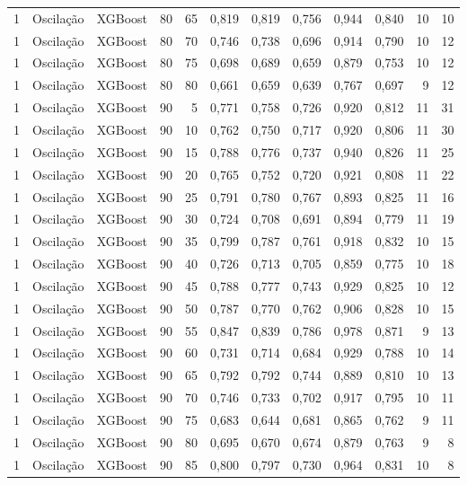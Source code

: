 \begin{longtable}{@{}rllrrrrrrrrr@{}}
1 & Oscilação & XGBoost & 80 & 65 & 0,819 & 0,819 & 0,756 & 0,944 & 0,840 & 10 & 10 \\
1 & Oscilação & XGBoost & 80 & 70 & 0,746 & 0,738 & 0,696 & 0,914 & 0,790 & 10 & 12 \\
1 & Oscilação & XGBoost & 80 & 75 & 0,698 & 0,689 & 0,659 & 0,879 & 0,753 & 10 & 12 \\
1 & Oscilação & XGBoost & 80 & 80 & 0,661 & 0,659 & 0,639 & 0,767 & 0,697 & 9 & 12 \\
1 & Oscilação & XGBoost & 90 & 5 & 0,771 & 0,758 & 0,726 & 0,920 & 0,812 & 11 & 31 \\
1 & Oscilação & XGBoost & 90 & 10 & 0,762 & 0,750 & 0,717 & 0,920 & 0,806 & 11 & 30 \\
1 & Oscilação & XGBoost & 90 & 15 & 0,788 & 0,776 & 0,737 & 0,940 & 0,826 & 11 & 25 \\
1 & Oscilação & XGBoost & 90 & 20 & 0,765 & 0,752 & 0,720 & 0,921 & 0,808 & 11 & 22 \\
1 & Oscilação & XGBoost & 90 & 25 & 0,791 & 0,780 & 0,767 & 0,893 & 0,825 & 11 & 16 \\
1 & Oscilação & XGBoost & 90 & 30 & 0,724 & 0,708 & 0,691 & 0,894 & 0,779 & 11 & 19 \\
1 & Oscilação & XGBoost & 90 & 35 & 0,799 & 0,787 & 0,761 & 0,918 & 0,832 & 10 & 15 \\
1 & Oscilação & XGBoost & 90 & 40 & 0,726 & 0,713 & 0,705 & 0,859 & 0,775 & 10 & 18 \\
1 & Oscilação & XGBoost & 90 & 45 & 0,788 & 0,777 & 0,743 & 0,929 & 0,825 & 10 & 12 \\
1 & Oscilação & XGBoost & 90 & 50 & 0,787 & 0,770 & 0,762 & 0,906 & 0,828 & 10 & 15 \\
1 & Oscilação & XGBoost & 90 & 55 & 0,847 & 0,839 & 0,786 & 0,978 & 0,871 & 9 & 13 \\
1 & Oscilação & XGBoost & 90 & 60 & 0,731 & 0,714 & 0,684 & 0,929 & 0,788 & 10 & 14 \\
1 & Oscilação & XGBoost & 90 & 65 & 0,792 & 0,792 & 0,744 & 0,889 & 0,810 & 10 & 13 \\
1 & Oscilação & XGBoost & 90 & 70 & 0,746 & 0,733 & 0,702 & 0,917 & 0,795 & 10 & 11 \\
1 & Oscilação & XGBoost & 90 & 75 & 0,683 & 0,644 & 0,681 & 0,865 & 0,762 & 9 & 11 \\
1 & Oscilação & XGBoost & 90 & 80 & 0,695 & 0,670 & 0,674 & 0,879 & 0,763 & 9 & 8 \\
1 & Oscilação & XGBoost & 90 & 85 & 0,800 & 0,797 & 0,730 & 0,964 & 0,831 & 10 & 8 \\

\end{longtable}

